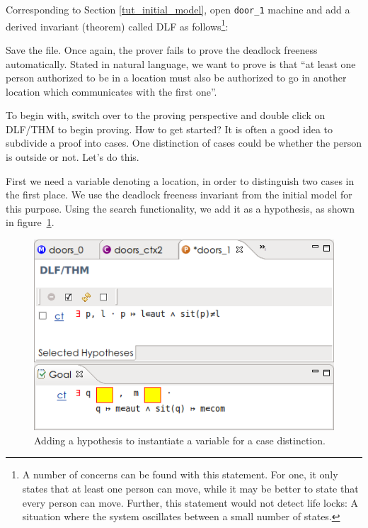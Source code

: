 
Corresponding to Section \ref{tut_initial_model}, open \texttt{door\_1} machine and add a derived invariant (theorem) called \textsf{DLF} as follows\footnote{A number of concerns can be found with this statement.  For one, it only states that at least one person can move, while it may be better to state that every person can move.  Further, this statement would not detect life locks: A situation where the system oscillates between a small number of states.}: 


Save the file. Once again, the prover fails to prove the deadlock freeness automatically. Stated in natural language, we want to prove is that ``at least one person authorized to be in a location must also be authorized to go in another location which communicates with the first one''.

To begin with, switch over to the proving perspective and double click on \textsf{DLF/THM} to begin proving.  How to get started?  It is often a good idea to subdivide a proof into cases.  One distinction of cases could be whether the person is outside or not.  Let's do this.

First we need a variable denoting a location, in order to distinguish two cases in the first place.  We use the deadlock freeness invariant from the initial model for this purpose.  Using the search functionality, we add it as a hypothesis, as shown in figure~\ref{tut_10_ref_proof1}.

\begin{figure}[!ht]
\begin{center}
	\includegraphics[]{img/tutorial/tut_10_ref_proof1.png}
	\caption{Adding a hypothesis to instantiate a variable for a case distinction.}
	\label{tut_10_ref_proof1}
\end{center}
\end{figure}

